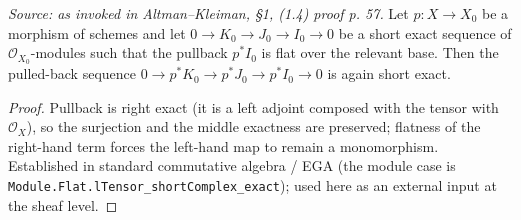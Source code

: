 \begin{theorem}
  \label{thm:flat_pullback_exact}
  \textit{Source: as invoked in Altman--Kleiman, §1, (1.4) proof p. 57.}
  Let $p : X \to X_0$ be a morphism of schemes and let
  $0 \to K_0 \to J_0 \to I_0 \to 0$ be a short exact sequence of
  $\mathcal{O}_{X_0}$-modules such that the pullback $p^* I_0$ is flat over the
  relevant base. Then the pulled-back sequence
  $0 \to p^* K_0 \to p^* J_0 \to p^* I_0 \to 0$ is again short exact.
  \begin{proof}
    Pullback is right exact (it is a left adjoint composed with the tensor with
    $\mathcal{O}_X$), so the surjection and the middle exactness are preserved;
    flatness of the right-hand term forces the left-hand map to remain a
    monomorphism. Established in standard commutative algebra / EGA (the module
    case is \texttt{Module.Flat.lTensor\_shortComplex\_exact}); used here as an
    external input at the sheaf level.
  \end{proof}
\end{theorem}

